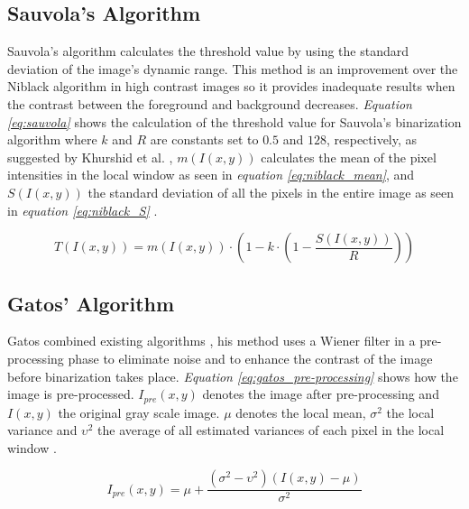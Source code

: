 \documentclass[11pt]{article}
\begin{document}
  		\subsection{Sauvola's Algorithm}
  			Sauvola's algorithm \cite{sauvola1997adaptive} calculates the threshold value by using the standard deviation of the image's dynamic range. This method is an improvement over the Niblack algorithm in high contrast images so it provides inadequate results when the contrast between the foreground and background decreases. \textit{Equation \ref{eq:sauvola}} shows the calculation of the threshold value for Sauvola's binarization algorithm where $k$ and $R$ are constants set to $0.5$ and $128$, respectively, as suggested by Khurshid et al. \cite{khurshid2009comparison}, $m(I(x, y))$ calculates the mean of the pixel intensities in the local window as seen in \textit{equation \ref{eq:niblack_mean}}, and $S(I(x, y))$ the standard deviation of all the pixels in the entire image as seen in \textit{equation \ref{eq:niblack_S}} \cite{khurshid2009comparison}.

				\begin{large}
				\begin{equation} \label{eq:sauvola}
					T(I(x, y)) = m(I(x, y)) \cdot (1 - k \cdot (1 - \frac{S(I(x, y))}{R}))
				\end{equation}
				\end{large}

			\subsection{Gatos' Algorithm}
				Gatos combined existing algorithms \cite{gatos2006adaptive}, his method uses a Wiener filter in a pre-processing phase to eliminate noise and to enhance the contrast of the image before binarization takes place. \textit{Equation \ref{eq:gatos_pre-processing}} shows how the image is pre-processed. $I_{pre}(x,y)$ denotes the image after pre-processing and $I(x,y)$ the original gray scale image. $\mu$ denotes the local mean, $\sigma^2$ the local variance and $\upsilon^2$ the average of all estimated variances of each pixel in the local window \cite{pai2010adaptive}.

				\begin{large}
				\begin{equation} \label{eq:gatos_pre-processing}
					I_{pre}(x, y) = \mu + \frac{(\sigma^2 - \upsilon^2)(I(x,y)-\mu)}{\sigma^2}
				\end{equation}
				\end{large}
\end{document}
